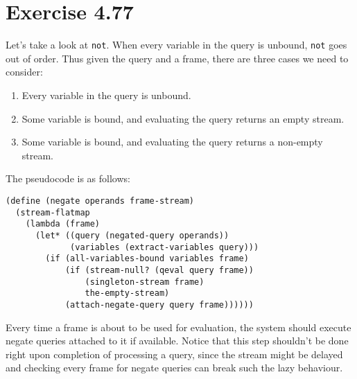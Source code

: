 \documentclass[../main.tex]{subfiles}
\begin{document}
\section{Exercise 4.77}

Let's take a look at \lstinline{not}. When every variable in the query is unbound, \lstinline{not} goes out of order. Thus given the query and a frame, there are three cases we need to consider:

\begin{enumerate}
\item Every variable in the query is unbound.
\item Some variable is bound, and evaluating the query returns an empty stream.
\item Some variable is bound, and evaluating the query returns a non-empty stream.
\end{enumerate}

The pseudocode is as follows:

\begin{lstlisting}
(define (negate operands frame-stream)
  (stream-flatmap
    (lambda (frame)
      (let* ((query (negated-query operands))
             (variables (extract-variables query)))
        (if (all-variables-bound variables frame)
            (if (stream-null? (qeval query frame))
                (singleton-stream frame)
                the-empty-stream)
            (attach-negate-query query frame))))))
\end{lstlisting}

Every time a frame is about to be used for evaluation, the system should execute negate queries attached to it if available. Notice that this step shouldn't be done right upon completion of processing a query, since the stream might be delayed and checking every frame for negate queries can break such the lazy behaviour.
\end{document}
